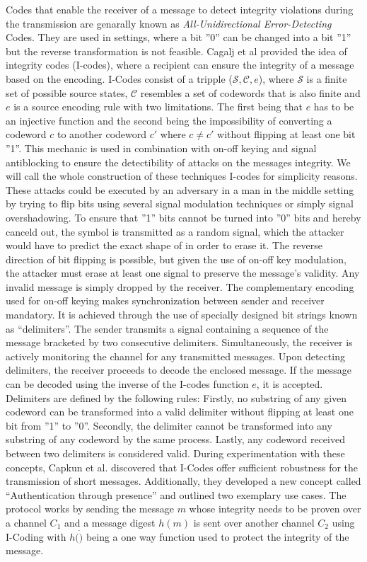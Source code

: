 \documentclass[conference]{IEEEtran}
\begin{document}
Codes that enable the receiver of a message to detect integrity violations during the transmission are genarally known as \textit{All-Unidirectional Error-Detecting} Codes.
They are used in settings, where a bit ''0'' can be changed into a bit ''1'' but the reverse transformation is not feasible. 
Cagalj et al provided the idea of integrity codes (I-codes), where a recipient can ensure the integrity of a message based on the encoding.
I-Codes consist of a tripple ($ \mathcal{S}, \mathcal{C}, e$), where $\mathcal{S}$ is a finite set of possible source states, $\mathcal{C}$ resembles a set of codewords that is also finite and $e$ is a source encoding rule with two limitations.
The first being that $e$ has to be an injective function and the second being the impossibility of converting a codeword $c$ to another codeword $c'$ where $c \neq c'$ without flipping at least one bit ''1''.
This mechanic is used in combination with on-off keying and signal antiblocking to ensure the detectibility of attacks on the messages integrity. We will call the whole construction of these techniques I-codes for simplicity reasons.
These attacks could be executed by an adversary in a man in the middle setting by trying to flip bits using several signal modulation techniques or simply signal overshadowing.
To ensure that ''1'' bits cannot be turned into ''0'' bits and hereby canceld out, the symbol is transmitted as a random signal, which the attacker would have to predict the exact shape of in order to erase it.
The reverse direction of bit flipping is possible, but given the use of on-off key modulation, the attacker must erase at least one signal to preserve the message's validity. Any invalid message is simply dropped by the receiver.
The complementary encoding used for on-off keying makes synchronization between sender and receiver mandatory. It is achieved through the use of specially designed bit strings known as ``delimiters''. The sender transmits a signal containing a sequence of the message bracketed by two consecutive delimiters. Simultaneously, the receiver is actively monitoring the channel for any transmitted messages. 
Upon detecting delimiters, the receiver proceeds to decode the enclosed message. If the message can be decoded using the inverse of the I-codes function $e$, it is accepted. Delimiters are defined by the following rules: Firstly, no substring of any given codeword can be transformed into a valid delimiter without flipping at least one bit from ''1'' to ''0''. Secondly, the delimiter cannot be transformed into any substring of any codeword by the same process. Lastly, any codeword received between two delimiters is considered valid.
During experimentation with these concepts, Capkun et al. discovered that I-Codes offer sufficient robustness for the transmission of short messages. Additionally, they developed a new concept called ``Authentication through presence'' and outlined two exemplary use cases.
The protocol works by sending the message $m$ whose integrity needs to be proven over a channel $C_1$ and a message digest $h(m)$ is sent over another channel $C_2$ using I-Coding with $h(\dot)$ being a one way function used to protect the integrity of the  message. \\
\end{document}
